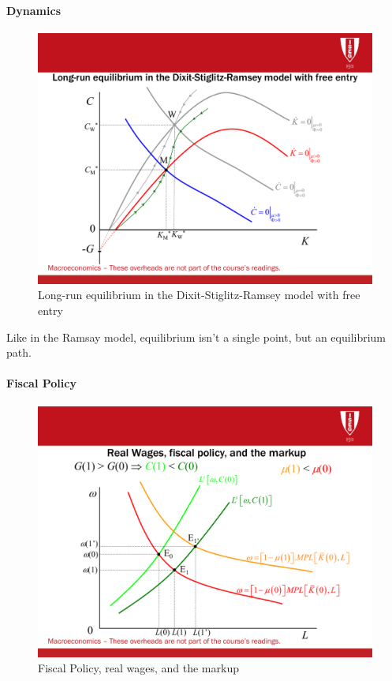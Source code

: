 \paragraph{Dynamics}

\begin{figure}[H]
    \centering
    \includegraphics[max width=\linewidth]{5_0_The_New_Macroeconomics/long_run_eq.pdf}
    \caption{Long-run equilibrium in the Dixit-Stiglitz-Ramsey model with free entry}
    \label{LR_Equilibrium}
\end{figure}
Like in the Ramsay model, equilibrium isn't a single point, but an equilibrium path.

\paragraph{Fiscal Policy}

\begin{figure}[H]
    \centering
    \includegraphics[max width=\linewidth]{5_0_The_New_Macroeconomics/Fiscal_Policy.pdf}
    \caption{Fiscal Policy, real wages, and the markup}
    \label{Fiscal_Policy}
\end{figure}

